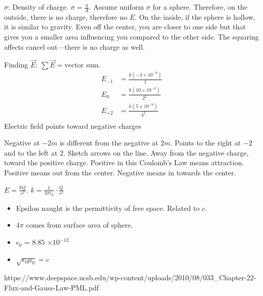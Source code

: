 \documentclass[article, 12pt]{article}
\theoremstyle{definition}
\begin{document}
    $\sigma$: Density of charge. $\sigma = \frac{q}{A}$. Assume uniform $\sigma$ for a sphere. Therefore, on the outside, there is no charge, therefore no $E$. On the inside, if the sphere is hollow, it is similar to gravity. Even off the center, you are closer to one side but that gives you a smaller area influencing you compared to the other side. The squaring affects cancel out---there is no charge as well. 
    Finding $\overrightarrow{E}$: $\sum \overrightarrow{E} = \text{vector sum}$.
    \begin{align*}
        E_{-1} &= \frac{k(-3 \times 10^{-9})}{1} \\
        E_{0} &= \frac{k(10 \times 10^{-9})}{2^2} \\
        E_{+2} &= \frac{k(5 \times 10^{-9})}{4^2} \\
    \end{align*}
    Electric field points toward negative charges

    Negative at $-2m$ is different from the negative at $2m$. Points to the right at $-2$ and to the left at $2$. Sketch arrows on the line. Away from the negative charge, toward the positive charge. Positive in this Coulomb's Law means attraction. Positive means out from the center. Negative means in towards the center.

    $E = \frac{kQ}{r^2}$. $k = \frac{1}{4\pi \epsilon_0} \cdot \frac{Q}{r^2}$
    \begin{itemize}
        \item Epsilon naught is the permittivity of free space. Related to $c$.
        \item $4\pi$ comes from surface area of sphere.
        \item $\epsilon_0$ = 8.85 $\times 10^{-12}$
        \item $\sqrt{\epsilon_0 \mu_0} = c$
    \end{itemize}
    https://www.deepspace.ucsb.edu/wp-content/uploads/2010/08/033_Chapter-22-Flux-and-Gauss-Law-PML.pdf
\end{document}
